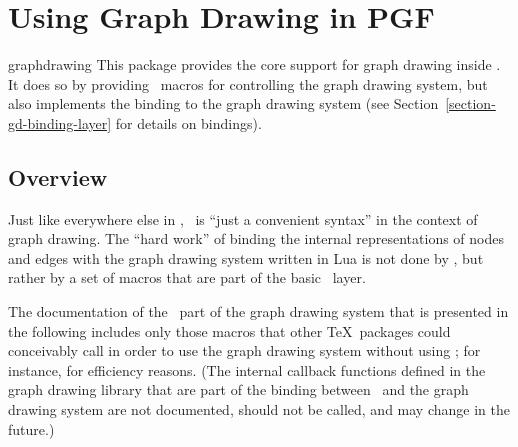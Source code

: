 %
%
%



\section{Using Graph Drawing in PGF}

\label{section-gd-pgf}

{}

\begin{purepgflibrary}{graphdrawing}
  This package provides the core support for graph drawing inside
  \pgfname. It does so by providing \pgfname\ macros for controlling
  the graph drawing system, but also implements the binding to the
  graph drawing system (see Section~\ref{section-gd-binding-layer} for
  details on bindings).
\end{purepgflibrary}

\subsection{Overview}

Just like everywhere else in \pgfname, \tikzname\ is ``just a
convenient syntax'' in the context of graph drawing. The ``hard work''
of binding the internal representations of nodes and edges with the graph
drawing system written in Lua is not done by \tikzname, but rather by
a set of macros that are part of the basic \pgfname\ layer.  

The documentation of the \pgfname\ part of the graph drawing system
that is presented in the following includes only those macros that
other \TeX\ packages could conceivably call in order to use the graph
drawing system without using \tikzname; for instance, for efficiency
reasons. (The internal callback functions defined in the graph drawing
library that are part of the binding between \pgfname\ and the graph
drawing system are not documented, should not be called, and may
change in the future.)



